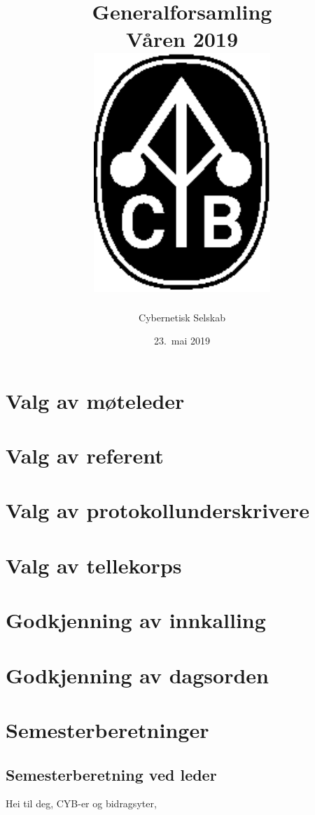 \documentclass[10pt,norsk,a4paper]{article}
\title{Generalforsamling \\
	Våren 2019\\[3cm]
	\includegraphics[width=0.5\textwidth]{cyb-logo.eps}\\[-.5cm]}
\date{23.\ mai 2019}
\author{Cybernetisk Selskab}
\begin{document}
\maketitle{}
\newpage
\tableofcontents

\section{Valg av møteleder}

\section{Valg av referent}

\section{Valg av protokollunderskrivere}

\section{Valg av tellekorps}

\section{Godkjenning av innkalling}

\section{Godkjenning av dagsorden}

\newpage

\section{Semesterberetninger}
\subsection{Semesterberetning ved leder}

Hei til deg, CYB-er og bidragsyter,
\end{document}
